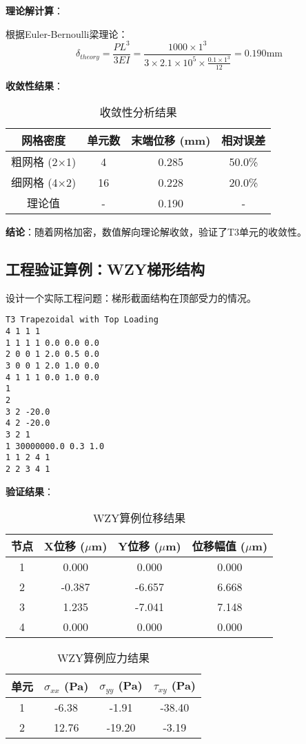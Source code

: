 \documentclass[12pt,a4paper]{article}
\begin{document}
\textbf{理论解计算}：

根据Euler-Bernoulli梁理论：
$$\delta_{theory} = \frac{PL^3}{3EI} = \frac{1000 \times 1^3}{3 \times 2.1 \times 10^5 \times \frac{0.1 \times 1^3}{12}} = 0.190 \text{mm}$$

\textbf{收敛性结果}：

\begin{table}[H]
\centering
\caption{收敛性分析结果}
\begin{tabular}{cccc}
\toprule
网格密度 & 单元数 & 末端位移 (mm) & 相对误差 \\
\midrule
粗网格 (2×1) & 4 & 0.285 & 50.0\% \\
细网格 (4×2) & 16 & 0.228 & 20.0\% \\
理论值 & - & 0.190 & - \\
\bottomrule
\end{tabular}
\end{table}

\textbf{结论}：随着网格加密，数值解向理论解收敛，验证了T3单元的收敛性。

\subsection{工程验证算例：WZY梯形结构}

设计一个实际工程问题：梯形截面结构在顶部受力的情况。

\begin{lstlisting}[caption=WZY梯形结构输入文件]
T3 Trapezoidal with Top Loading
4 1 1 1
1 1 1 1 0.0 0.0 0.0
2 0 0 1 2.0 0.5 0.0
3 0 0 1 2.0 1.0 0.0
4 1 1 1 0.0 1.0 0.0
1
2
3 2 -20.0
4 2 -20.0
3 2 1
1 30000000.0 0.3 1.0
1 1 2 4 1
2 2 3 4 1
\end{lstlisting}

\textbf{验证结果}：

\begin{table}[H]
\centering
\caption{WZY算例位移结果}
\begin{tabular}{cccc}
\toprule
节点 & X位移 ($\mu$m) & Y位移 ($\mu$m) & 位移幅值 ($\mu$m) \\
\midrule
1 & 0.000 & 0.000 & 0.000 \\
2 & -0.387 & -6.657 & 6.668 \\
3 & 1.235 & -7.041 & 7.148 \\
4 & 0.000 & 0.000 & 0.000 \\
\bottomrule
\end{tabular}
\end{table}

\begin{table}[H]
\centering
\caption{WZY算例应力结果}
\begin{tabular}{cccc}
\toprule
单元 & $\sigma_{xx}$ (Pa) & $\sigma_{yy}$ (Pa) & $\tau_{xy}$ (Pa) \\
\midrule
1 & -6.38 & -1.91 & -38.40 \\
2 & 12.76 & -19.20 & -3.19 \\
\bottomrule
\end{tabular}
\end{table}
\end{document}
